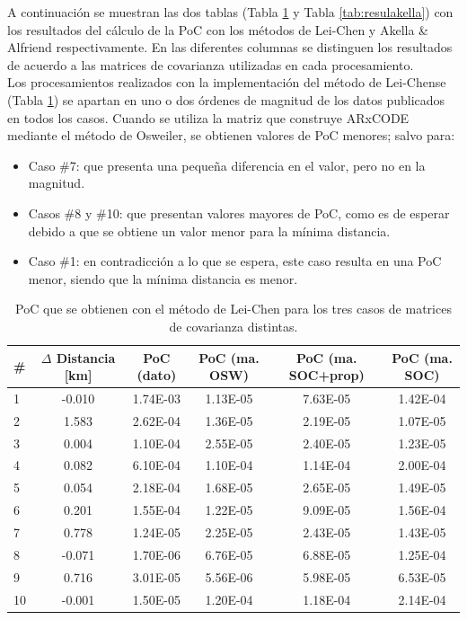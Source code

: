 A continuaci\'on se muestran las dos tablas (Tabla \ref{tab:resulLeichen} y Tabla \ref{tab:resulakella}) con los resultados del c\'alculo de la PoC con los m\'etodos de Lei-Chen y Akella \& Alfriend respectivamente. En las diferentes columnas se distinguen los resultados de acuerdo a las matrices de covarianza utilizadas en cada procesamiento.\\

Los procesamientos realizados con la implementaci\'on del m\'etodo de Lei-Chense (Tabla \ref{tab:resulLeichen}) se apartan en uno o dos \'ordenes de magnitud de los datos publicados en todos los casos. Cuando se utiliza la matriz que construye ARxCODE mediante el m\'etodo de Osweiler, se obtienen valores de PoC menores; salvo para:\\

\begin{itemize}
 \item Caso \#7: que presenta una pequeña diferencia en el valor, pero no en la magnitud.
 \item Casos \#8 y \#10: que presentan valores mayores de PoC, como es de esperar debido a que se obtiene un valor menor para la m\'inima distancia.
 \item Caso \#1: en contradicci\'on a lo que se espera, este caso resulta en una PoC menor, siendo que la m\'inima distancia es menor. 
\end{itemize}


\begin{table}[!h]
 \caption{PoC que se obtienen con el m\'etodo de Lei-Chen para los tres casos de matrices de covarianza distintas.}
\label{tab:resulLeichen}
\begin{tabular}{lccccc}
 \hline \hline
 \# & $\Delta$ Distancia [km] & PoC (dato) & PoC (ma. OSW) & PoC (ma. SOC+prop) & PoC (ma. SOC) \\
 \hline \hline
1&-0.010&1.74E-03&1.13E-05&7.63E-05&1.42E-04\\
2&1.583&2.62E-04&1.36E-05&2.19E-05&1.07E-05\\
3&0.004&1.10E-04&2.55E-05&2.40E-05&1.23E-05\\
4&0.082&6.10E-04&1.10E-04&1.14E-04&2.00E-04\\
5&0.054&2.18E-04&1.68E-05&2.65E-05&1.49E-05\\
6&0.201&1.55E-04&1.22E-05&9.09E-05&1.56E-04\\
7&0.778&1.24E-05&2.25E-05&2.43E-05&1.43E-05\\
8&-0.071&1.70E-06&6.76E-05&6.88E-05&1.25E-04\\
9&0.716&3.01E-05&5.56E-06&5.98E-05&6.53E-05\\
10&-0.001&1.50E-05&1.20E-04&1.18E-04&2.14E-04\\
 \hline
\end{tabular} 
\end{table}

